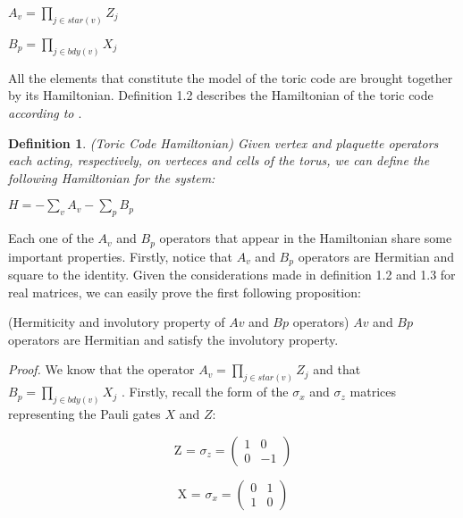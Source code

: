 \documentclass{Configuration_Files/PoliMi3i_thesis}
\newtheorem{definition}{Definition}[chapter]
\begin{document}
\begin{center}
	$ A_v = \prod_{j \in star(v)} Z_j $ 
	
	$ B_p = \prod_{j \in bdy(v)} X_j $
\end{center}


All the elements that constitute the model of the toric code are brought together by its Hamiltonian. Definition 1.2 describes the Hamiltonian of the toric code 
\textit{according to \cite{Her20}}.

\begin{definition} (Toric Code Hamiltonian) Given vertex and plaquette operators each acting, respectively, on verteces and cells of the torus, we can define the following Hamiltonian for the system:
\end{definition}

\begin{center}
	
	$H = -\sum_{v} 
	A_v - \sum_{p} B_p $
	
\end{center}

Each one of the $A_v$ and $B_p$ operators that appear in the Hamiltonian share some important properties. Firstly, notice that $A_v$ and $B_p$ operators are Hermitian and square to the identity. Given the considerations made in definition 1.2 and 1.3 for real matrices, we can easily prove the first following proposition:

\begin{proposition} (Hermiticity and involutory property of $Av$ and $Bp$ operators)
$Av$ and $Bp$ operators are Hermitian and satisfy the involutory property.
\end{proposition}
	
\textit{Proof.}
We know that the operator $ A_v = \prod_{j \in star(v)} Z_j $ and that $ B_p = \prod_{j \in bdy(v)} X_j $ .\newline
Firstly, recall the form of the $\sigma_x$ and $\sigma_z$ matrices representing the Pauli gates $X$ and $Z$:



\[
\text{Z = $\sigma_z$} =
\begin{pmatrix}
	1 & 0 \\
	0 & -1
\end{pmatrix}
\]


\[
\text{X = $\sigma_x$} =
\begin{pmatrix}
	0 & 1 \\
	1 & 0
\end{pmatrix}
\]
\end{document}
